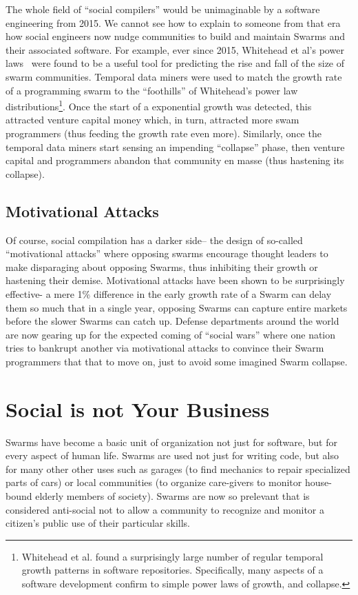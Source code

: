 \documentclass[journal]{IEEEtran}
\begin{document}
\begin{itemize}
The whole field of ``social compilers''
would be unimaginable by a software engineering from 2015.
We cannot see how to explain to someone from that era
how social engineers now nudge communities to build
and maintain Swarms and their associated software.
For example, ever since 2015,
Whitehead et al's  power laws~\cite{power15}
 were found to be
a useful tool for predicting the rise
and fall of the size of swarm communities.
Temporal data miners
were used to match the growth rate of a programming
swarm to the ``foothills'' of Whitehead's power law
distributions\footnote{Whitehead et al.
  found a surprisingly large
  number of regular temporal growth patterns
  in software repositories. Specifically,
  many aspects of a software development confirm
  to simple power laws of growth, and collapse.
}.
Once the start of a exponential
growth was detected, this attracted venture capital
money which, in turn, attracted more swam
programmers (thus feeding the growth rate even
more).  Similarly, once the temporal data miners
start sensing an impending ``collapse'' phase, then
venture capital and programmers abandon that
community en masse (thus hastening its collapse).



\subsection{Motivational Attacks}

Of course, social compilation has a darker side--
the design of so-called ``motivational
attacks'' where opposing swarms encourage thought
leaders to make disparaging about opposing Swarms,
thus inhibiting their growth or hastening their
demise.  Motivational attacks
have been shown to be
surprisingly effective- a mere 1\% difference in the
early growth rate of a Swarm can delay them so much
that in a single year, opposing Swarms can capture
entire markets before the slower Swarms can catch
up. 
Defense departments around the world are now
gearing up for the expected coming of ``social wars''
where one nation tries to bankrupt another via
motivational attacks to convince their
Swarm programmers that that  to move on,
just to avoid some imagined Swarm collapse.



\section{Social is not Your Business}
Swarms have become a basic unit of organization
not just for software, but for every aspect of human life.
Swarms are used not just for writing code, but
also for many other other uses such as
garages (to find mechanics to repair
specialized parts of cars) or local communities
(to organize care-givers to monitor house-bound
elderly members of society).
Swarms are now so prelevant that is considered anti-social
not to allow a community to recognize and monitor
a citizen's public use of their particular skills.


\end{itemize}
\end{document}
